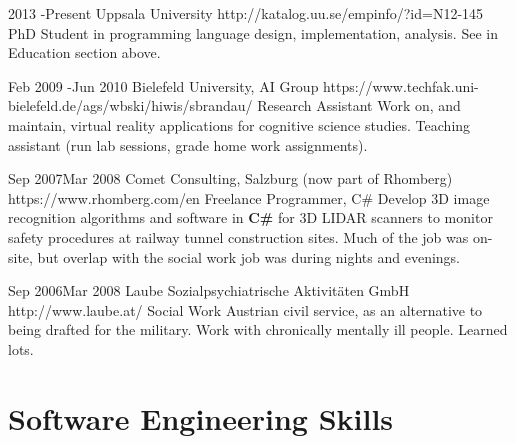 \documentclass[10pt]{article} %
\begin{document}
\job
{2013 -}{Present}
{Uppsala University}
{http://katalog.uu.se/empinfo/?id=N12-145}
{PhD Student in programming language design, implementation, analysis.}
{See in Education section above.}


\job
{Feb 2009 -}{Jun 2010}
{Bielefeld University, AI Group}
{https://www.techfak.uni-bielefeld.de/ags/wbski/hiwis/sbrandau/}
{Research Assistant}
{Work on, and maintain, virtual reality applications for cognitive science
  studies. Teaching assistant (run lab sessions, grade home work assignments).}


\job
{Sep 2007}{Mar 2008}
{Comet Consulting, Salzburg (now part of Rhomberg)}
{https://www.rhomberg.com/en}
{Freelance Programmer, C\#}
{Develop 3D image recognition algorithms and software in \textbf{C\#} for 3D
  LIDAR scanners to monitor safety procedures at railway tunnel construction
  sites. Much of the job was on-site, but overlap with the social work job was
  during nights and evenings.}


\job
{Sep 2006}{Mar 2008}
{Laube Sozialpsychiatrische Aktivitäten GmbH}
{http://www.laube.at/}
{Social Work}
{Austrian civil service, as an alternative to being drafted for the military.
  Work with chronically mentally ill people. Learned lots.}


\section{Software Engineering Skills}

\end{document}

